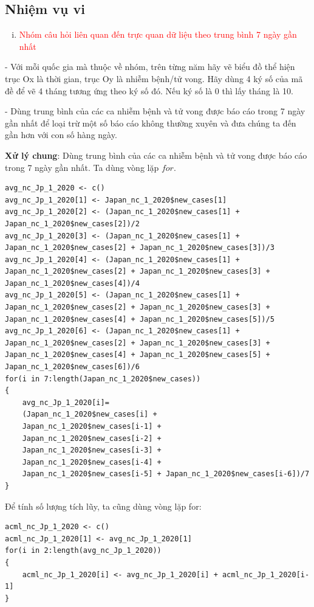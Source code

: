 \documentclass[a4paper]{article}
\theoremstyle{definition}
\begin{document}
\subsection{Nhiệm vụ vi}
\begin{enumerate}[vi)]
\item \textcolor{red}{Nhóm câu hỏi liên quan đến trực quan dữ liệu theo trung bình 7 ngày gần nhất}
\end{enumerate}
- Với mỗi quốc gia mà thuộc về nhóm, trên từng năm hãy vẽ biểu đồ thể hiện trục Ox là thời gian, trục Oy là nhiễm bệnh/tử vong. Hãy dùng 4 ký số của mã đề để vẽ 4 tháng tương ứng theo ký số đó. Nếu ký số là 0 thì lấy tháng là 10.

- Dùng trung bình của các ca nhiễm bệnh và tử vong được báo cáo trong 7 ngày gần nhất để loại trừ một số báo cáo không thường xuyên và đưa chúng ta đến gần hơn với con số hàng ngày.

\textbf{Xử lý chung}: Dùng trung bình của các ca nhiễm bệnh và tử vong được báo cáo trong 7 ngày gần nhất. Ta dùng vòng lặp $for$.
		
		\begin{lstlisting}
avg_nc_Jp_1_2020 <- c()
avg_nc_Jp_1_2020[1] <- Japan_nc_1_2020$new_cases[1]
avg_nc_Jp_1_2020[2] <- (Japan_nc_1_2020$new_cases[1] + Japan_nc_1_2020$new_cases[2])/2
avg_nc_Jp_1_2020[3] <- (Japan_nc_1_2020$new_cases[1] + Japan_nc_1_2020$new_cases[2] + Japan_nc_1_2020$new_cases[3])/3
avg_nc_Jp_1_2020[4] <- (Japan_nc_1_2020$new_cases[1] + Japan_nc_1_2020$new_cases[2] + Japan_nc_1_2020$new_cases[3] + Japan_nc_1_2020$new_cases[4])/4
avg_nc_Jp_1_2020[5] <- (Japan_nc_1_2020$new_cases[1] + Japan_nc_1_2020$new_cases[2] + Japan_nc_1_2020$new_cases[3] + Japan_nc_1_2020$new_cases[4] + Japan_nc_1_2020$new_cases[5])/5
avg_nc_Jp_1_2020[6] <- (Japan_nc_1_2020$new_cases[1] + Japan_nc_1_2020$new_cases[2] + Japan_nc_1_2020$new_cases[3] + Japan_nc_1_2020$new_cases[4] + Japan_nc_1_2020$new_cases[5] + Japan_nc_1_2020$new_cases[6])/6
for(i in 7:length(Japan_nc_1_2020$new_cases))
{
	avg_nc_Jp_1_2020[i]=
	(Japan_nc_1_2020$new_cases[i] + 
	Japan_nc_1_2020$new_cases[i-1] + 
	Japan_nc_1_2020$new_cases[i-2] + 
	Japan_nc_1_2020$new_cases[i-3] + 
	Japan_nc_1_2020$new_cases[i-4] + 
	Japan_nc_1_2020$new_cases[i-5] + Japan_nc_1_2020$new_cases[i-6])/7
}
	\end{lstlisting}
	
		Để tính số lượng tích lũy, ta cũng dùng vòng lặp for:
		
\begin{lstlisting}
acml_nc_Jp_1_2020 <- c()
acml_nc_Jp_1_2020[1] <- avg_nc_Jp_1_2020[1]
for(i in 2:length(avg_nc_Jp_1_2020))
{
	acml_nc_Jp_1_2020[i] <- avg_nc_Jp_1_2020[i] + acml_nc_Jp_1_2020[i-1]
}
	\end{lstlisting}
	
\end{document}
